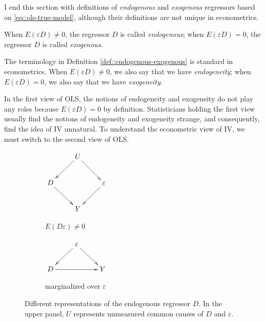 I end this section with definitions of {\it endogenous} and {\it exogenous} regressors based on \eqref{eq::ols-true-model}, although their definitions are not unique in econometrics. 



\begin{definition}
\label{def::endogenous-exogenous}
When $E(\varepsilon D) \neq  0$, the regressor $D$ is called {\it endogenous}; when $E(\varepsilon D) =  0$, the regressor $D$ is called {\it exogenous}. 
\end{definition}

The terminology in Definition \ref{def::endogenous-exogenous} is standard in econometrics. 
When $E(\varepsilon D) \neq  0$, we also say that we have {\it endogeneity}; when $E(\varepsilon D) =  0$, we also say that we have {\it exogeneity}.

In the first view of OLS, the notions of endogeneity and exogeneity do not play any roles because $E(\varepsilon D) =  0$ by definition.  Statisticians holding the first view usually find the notions of endogeneity and exogeneity strange, and consequently, find the idea of IV unnatural. To understand the econometric view of IV, we must switch to the second view of OLS. 




 

\begin{figure}[h]
\centering
\begin{subfigure}[]{0.4\textwidth}
                \centering
$
\xymatrix{
& U \ar[dl] \ar[dr]& \\
D \ar[dr] & & \varepsilon \ar[dl] \\
&Y&
}
$                \caption{$E(D\varepsilon) \neq 0$}
        \end{subfigure}%
        
        \begin{subfigure}[]{0.4\textwidth}
                \centering
$
\xymatrix{
&\varepsilon  \ar[dl] \ar[dr] &\\
D \ar[rr]&&Y
}
$
                \caption{marginalized over $\varepsilon$}
        \end{subfigure}%
        
\caption{ Different representations of the endogenous regressor $D$. In the upper panel, $U$ represents unmeasured common causes of $D$ and $\varepsilon$.}\label{fig::endogenous-regressor}
\end{figure}



